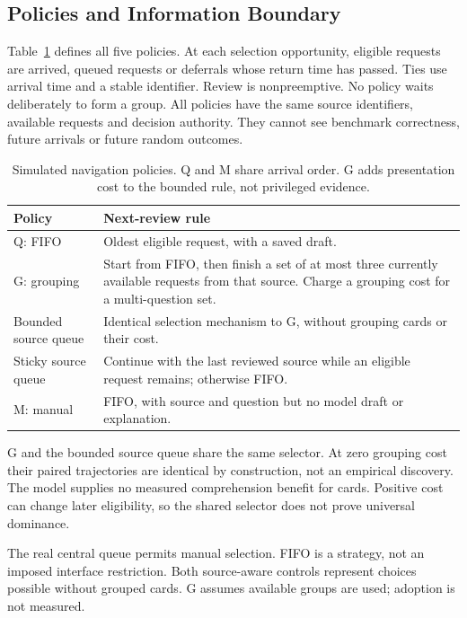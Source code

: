 \documentclass[a4paper,twoside]{article}
\begin{document}
\subsection{Policies and Information Boundary}
Table~\ref{tab:policies} defines all five policies. At each selection opportunity, eligible requests are arrived, queued requests or deferrals whose return time has passed. Ties use arrival time and a stable identifier. Review is nonpreemptive. No policy waits deliberately to form a group. All policies have the same source identifiers, available requests and decision authority. They cannot see benchmark correctness, future arrivals or future random outcomes.

\begin{table}[t]
\caption{Simulated navigation policies. Q and M share arrival order. G adds presentation cost to the bounded rule, not privileged evidence.}
\label{tab:policies}
\centering
\begin{tabular}{@{}>{\raggedright\arraybackslash}p{.21\linewidth}>{\raggedright\arraybackslash}p{.725\linewidth}@{}}
\toprule
Policy & Next-review rule \\
\midrule
Q: FIFO & Oldest eligible request, with a saved draft. \\
G: grouping & Start from FIFO, then finish a set of at most three currently available requests from that source. Charge a grouping cost for a multi-question set. \\
Bounded source queue & Identical selection mechanism to G, without grouping cards or their cost. \\
Sticky source queue & Continue with the last reviewed source while an eligible request remains; otherwise FIFO. \\
M: manual & FIFO, with source and question but no model draft or explanation. \\
\bottomrule
\end{tabular}
\end{table}

G and the bounded source queue share the same selector. At zero grouping cost their paired trajectories are identical by construction, not an empirical discovery. The model supplies no measured comprehension benefit for cards. Positive cost can change later eligibility, so the shared selector does not prove universal dominance.

The real central queue permits manual selection. FIFO is a strategy, not an imposed interface restriction. Both source-aware controls represent choices possible without grouped cards. G assumes available groups are used; adoption is not measured.
\end{document}
